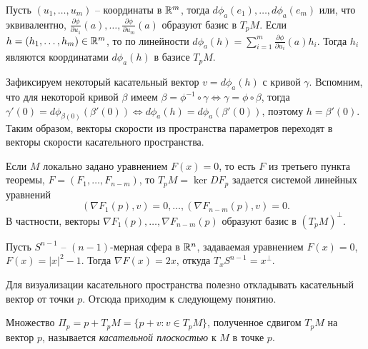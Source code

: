 \begin{note}
	Пусть $(u_1, \dotsc, u_m)$ -- координаты в $\mathbb{R}^m$, тогда $d\phi_a(e_1), \dotsc, d\phi_a(e_m)$ или, что эквивалентно, $\frac{\partial \phi}{\partial u_1}(a), \dotsc, \frac{\partial \phi}{\partial u_m}(a)$ образуют базис в $T_p M$. 
	Если $h = (h_1, \dotsc, h_m) \in \mathbb{R}^m$, то по линейности $d \phi_a (h) = \sum \limits_{i=1}^{m} \frac{\partial \phi}{\partial u_i}(a) h_i$.
	Тогда $h_i$ являются координатами $d \phi_a(h)$ в базисе $T_p M$.
	
	Зафиксируем некоторый касательный вектор $v = d \phi_a(h)$ с кривой $\gamma$. Вспомним, что для некоторой кривой $\beta$ имеем $\beta = \phi^{-1} \circ \gamma \Leftrightarrow \gamma = \phi \circ \beta$, тогда $\gamma'(0) =  d \phi_{\beta(0)} (\beta'(0)) \Leftrightarrow d \phi_a(h) = d \phi_a (\beta'(0))$, поэтому $h = \beta'(0)$.
	Таким образом, векторы скорости из пространства параметров переходят в векторы скорости касательного пространства.
\end{note}

\begin{corollary}
	Если $M$ локально задано уравнением $F(x) = 0$, то есть $F$ из третьего пункта теоремы, $F = (F_1, \dotsc, F_{n-m})$, то 
	$T_p M = \ker DF_p$ задается системой линейных уравнений 
	\[ (\nabla F_1 (p), v) = 0, \dotsc, (\nabla F_{n-m} (p), v) = 0. \]
	В частности, векторы $\nabla F_1 (p), \dotsc, \nabla F_{n-m} (p)$ образуют базис в $(T_p M)^{\perp}$.
\end{corollary}

\begin{example}
	Пусть $S^{n-1}$ -- $(n-1)$-мерная сфера в $\mathbb{R}^n$, задаваемая уравнением $F(x) = 0$, $F(x) = |x|^2 - 1$. 
	Тогда $\nabla F(x) = 2x$, откуда $T_x S^{n-1} = x^{\perp}$.
\end{example}

Для визуализации касательного пространства полезно откладывать касательный вектор от точки $p$.
Отсюда приходим к следующему понятию.

\begin{definition}
	Множество $\Pi_p = p + T_p M = \{p + v : v \in T_p M\}$, полученное сдвигом $T_p M$ на вектор $p$, называется \textit{касательной плоскостью} к $M$ в точке $p$. 
\end{definition}

